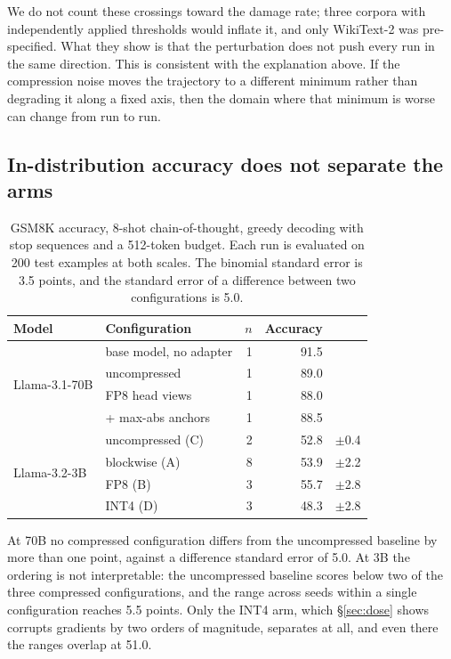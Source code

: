 \documentclass[11pt,letterpaper]{article}
\begin{document}
We do not count these crossings toward the damage rate; three corpora with independently applied thresholds would inflate it, and only WikiText-2 was pre-specified. What they show is that the perturbation does not push every run in the same direction. This is consistent with the explanation above. If the compression noise moves the trajectory to a different minimum rather than degrading it along a fixed axis, then the domain where that minimum is worse can change from run to run.


\subsection{In-distribution accuracy does not separate the arms}
\label{sec:accuracy}

\begin{table}[t]
\centering
\small
\caption{GSM8K accuracy, 8-shot chain-of-thought, greedy decoding with stop sequences and a 512-token budget. Each run is evaluated on 200 test examples at both scales. The binomial standard error is 3.5 points, and the standard error of a difference between two configurations is 5.0.}
\label{tab:accuracy}
\begin{tabular}{llrrl}
\toprule
Model & Configuration & $n$ & Accuracy & \\
\midrule
\multirow{4}{*}{Llama-3.1-70B}
 & base model, no adapter & 1 & 91.5 & \\
 & uncompressed           & 1 & 89.0 & \\
 & FP8 head views & 1 & 88.0 & \\
 & \quad + max-abs anchors & 1 & 88.5 & \\
\midrule
\multirow{4}{*}{Llama-3.2-3B}
  & uncompressed (C)   & 2 & 52.8 & $\pm$0.4 \\
 & blockwise (A)      & 8 & 53.9 & $\pm$2.2 \\
 & FP8 (B)            & 3 & 55.7 & $\pm$2.8 \\
 & INT4 (D)           & 3 & 48.3 & $\pm$2.8 \\
\bottomrule
\end{tabular}
\end{table}

At 70B no compressed configuration differs from the uncompressed baseline by more than one point, against a difference standard error of 5.0. At 3B the ordering is not interpretable: the uncompressed baseline scores below two of the three compressed configurations, and the range across seeds within a single configuration reaches 5.5 points. Only the INT4 arm, which \S\ref{sec:dose} shows corrupts gradients by two orders of magnitude, separates at all, and even there the ranges overlap at 51.0.
\end{document}
